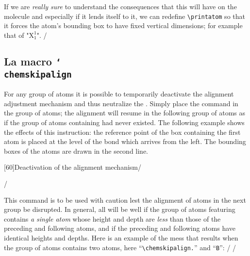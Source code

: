 \documentclass[10pt]{article}
\makeatletter
\newcommand\make@car@active[1]{%
	\catcode`#1\active
	\begingroup
		\lccode`\~`#1\relax
		\lowercase{\endgroup\def~}%
}
\newif\if@exstar
\newcommand\exemple{%
	\begingroup
	\parskip\z@
	\@makeother\;\@makeother\!\@makeother\?\@makeother\:%
	\@ifstar{\@exstartrue\exemple@}{\@exstarfalse\exemple@}}
\newcommand\exemple@[2][65]{%
	\medbreak\noindent
	\begingroup
		\let\do\@makeother\dospecials
		\make@car@active\ { {}}%
		\make@car@active\^^M{\par\leavevmode}%
		\make@car@active\^^I{\space\space}%
		\make@car@active\,{\leavevmode\kern\z@\string,}%
		\make@car@active\-{\leavevmode\kern\z@\string-}%
		\make@car@active\>{\leavevmode\kern\z@\string>}%
		\make@car@active\<{\leavevmode\kern\z@\string<}%
		\exemple@@{#1}{#2}%
}
\newcommand\exemple@@[3]{%
	\def\@tempa##1#3{\exemple@@@{#1}{#2}{##1}}%
	\@tempa
}
\newcommand\exemple@@@[3]{%
	\xdef\the@code{#3}%
	\endgroup
	\if@exstar
		\begingroup
			\fboxrule0.4pt
			\let\breakboxparindent\z@
			\def\bkvz@bottom{\hrule\@height\fboxrule}%
			\let\bkvz@before@breakbox\relax
			\def\bkvz@set@linewidth{\advance\linewidth\dimexpr-2\fboxrule-2\fboxsep}%
			\def\bkvz@left{\vrule\@width\fboxrule\hskip\fboxsep}%
			\def\bkvz@right{\hskip\fboxsep\vrule\@width\fboxrule}%
			\def\bkvz@top{\hbox to \hsize{%
				\vrule\@width\fboxrule\@height\fboxrule
				\leaders\bkvz@bottom\hfill
				\sffamily
				\fboxsep\z@
				\colorbox{black}{\kern0.25em\color{white}\footnotesize\lower0.5ex\hbox{\strut#2}\kern0.25em}%
				\leaders\bkvz@bottom\hfill
				\vrule\@width\fboxrule\@height\fboxrule}}%
			\breakbox
				\kern.5ex\relax
				\ttfamily\footnotesize\the@code\par
				\normalfont
				\kern3pt
				\hrule height0.1pt width\linewidth depth0.1pt
				\vskip5pt
				\rightskip0pt plus 1fill
				\everypar{{\color{lightgray}\rlap{\vrule height0.1pt width\linewidth depth0.1pt}}\hskip0pt plus 1fill}%
				\newlinechar`\^^M\everyeof{\noexpand}\scantokens{#3}\par
			\endbreakbox
		\endgroup
	\else
		\vskip0.5ex
		\boxput*(0,1)
			{\fboxsep\z@
			\hbox{\sffamily\colorbox{black}{\leavevmode\kern0.25em{\color{white}\footnotesize\strut#2}\kern0.25em}}%
			}%
			{\fboxsep5pt
			\fbox{%
				$\vcenter{\hsize\dimexpr0.#1\linewidth-\fboxsep-\fboxrule\relax
					\kern5pt\parskip0pt \ttfamily\footnotesize\the@code}%
				\vcenter{\kern5pt\hsize\dimexpr\linewidth-0.#1\linewidth-\fboxsep-\fboxrule\relax
					\everypar{{\color{lightgray}\rlap{\vrule height0.1pt width\dimexpr\linewidth-0.#1\linewidth-\fboxsep-\fboxrule depth0.1pt}}}%
					\footnotesize\newlinechar`\^^M\everyeof{\noexpand}\scantokens{#3}}$%
				}%
			}%
	\fi
	\medbreak
	\endgroup
}
\newcommand\falseverb[1]{{\ttfamily\detokenize\expandafter{\string#1}}}
\makeatother
\begin{document}
If we are \emph{really sure} to understand the consequences that this will have on the molecule and especially if it lends itself to it, we can redefine \verb|\printatom| so that it forces the atom's bounding box to have fixed vertical dimensions; for example that of "$\mathrm{X^1_1}$".
\exemple*{Redefinition of \string\printatom}/\Huge\setchemfig{atom sep=2em}
\let\oldprintatom\printatom
\renewcommand\printatom[1]{%
	\begingroup
		\setbox0\hbox{\oldprintatom{X^1_1}}%
		\edef\tmp{\ht0=\the\ht0\relax\dp0=\the\dp0\box0 }%
		\setbox0\hbox{\oldprintatom{#1}}%
		\ifnum1\ifdim\ht0=0pt0\fi\ifdim\dp0=0pt0\fi\ifdim\wd0=0pt0\fi<1000
			\tmp
		\fi
	\endgroup
}
\qquad
{}/

\subsection{La macro \texttt{\char`\\chemskipalign}}\label{chemskipalign}
For any group of atoms it is possible to temporarily deactivate the alignment adjustment mechanism and thus neutralize the \falseverb{\vphantom}. Simply place the \falseverb{\chemskipalign} command in the group of atoms; the alignment will resume in the following group of atoms as if the group of atoms containing \falseverb{\chemskipalign} had never existed. The following example shows the effects of this instruction: the reference point of the box containing the first atom is placed at the level of the bond which arrives from the left. The bounding boxes of the atoms are drawn in the second line.

\exemple[60]{Deactivation of the alignment mechanism}/\large
{}\quad
{}\par\bigskip
\fboxsep=0pt
\renewcommand\printatom[1]{\fbox{\ensuremath{\mathrm{#1}}}}
\quad
{}/

This command is to be used with caution lest the alignment of atoms in the next group be disrupted. In general, all will be well if the group of atoms featuring \falseverb{\chemskipalign} contains \emph{a single atom} whose height and depth are \emph{less} than those of the preceding and following atoms, and if the preceding and following atoms have identical heights and depths. Here is an example of the mess that results when the group of atoms contains two atoms, here ``\verb-\chemskipalign.-'' and ``\verb-B-'':
\exemple{Consequence of the \string\chemskipalign command}/\large
\fboxsep=0pt
\renewcommand\printatom[1]{\fbox{\ensuremath{\mathrm{#1}}}}
/
\end{document}
